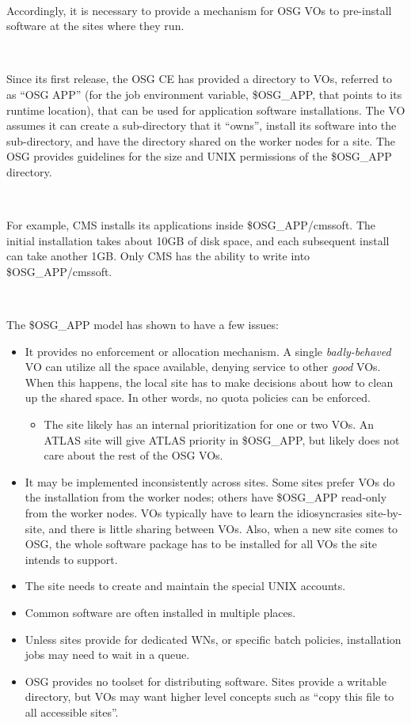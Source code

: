 \documentclass{article}
\begin{document}
~

Accordingly, it is necessary to provide a mechanism for OSG VOs to pre-install software at the sites where they run.

~

Since its first release, the OSG CE has provided a directory to VOs, referred to as ``OSG APP'' 
(for the job environment variable, \$OSG\_APP, that points to its runtime location), 
that can be used for application software installations.  
The VO assumes it can create a sub-directory that it “owns”, 
install its software into the sub-directory, and have the directory shared on the worker nodes for a site. 
The OSG provides guidelines for the size and UNIX permissions of the \$OSG\_APP directory.

~

For example, CMS installs its applications inside \$OSG\_APP/cmssoft.  
The initial installation takes about 10GB of disk space, and each subsequent install can take another 1GB.  
Only CMS has the ability to write into \$OSG\_APP/cmssoft.

~

The \$OSG\_APP model has shown to have a few issues:

\begin{itemize} 
\item It provides no enforcement or allocation mechanism.  
      A single \textit{badly-behaved} VO can utilize all the space available, 
      denying service to other \textit{good} VOs.  
      When this happens, the local site has to make decisions about how to clean up the shared space.
      In other words, no quota policies can be enforced.
      \begin{itemize}
          \item The site likely has an internal prioritization for one or two VOs.  
                An ATLAS site will give ATLAS priority in \$OSG\_APP, 
                but likely does not care about the rest of the OSG VOs.
      \end{itemize}
\item It may be implemented inconsistently across sites.  
      Some sites prefer VOs do the installation from the worker nodes; 
      others have \$OSG\_APP read-only from the worker nodes.  
      VOs typically have to learn the idiosyncrasies site-by-site, and there is little sharing between VOs.
      Also, when a new site comes to OSG, the whole software package has to be installed for all VOs the site intends to support.
\item The site needs to create and maintain the special UNIX accounts.
\item Common software are often installed in multiple places.
\item Unless sites provide for dedicated WNs, or specific batch policies,
      installation jobs may need to wait in a queue.
\item OSG provides no toolset for distributing software.  
      Sites provide a writable directory, 
      but VOs may want higher level concepts such as ``copy this file to all accessible sites''.
\end{itemize} 
\end{document}
